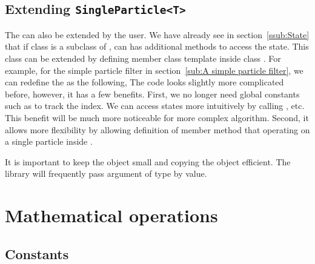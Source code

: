 \documentclass[11pt,bib,mint,hyper,altcolor]{marticle}
\def\spt{\texttt{SingleParticle<T>}}
\begin{document}
\subsection{Extending \protect\spt}
\label{sub:Extending spt}

The  can also be extended by the user. We have
already see in section~\ref{ssub:State} that if class  is a
subclass of ,  can has
additional methods to access the state. This class can be extended by defining
member class template inside class . For example, for the simple
particle filter in section~\ref{sub:A simple particle filter}, we can redefine
the  as the following,
The code looks slightly more complicated before, however, it has a few
benefits. First, we no longer need global constants such as  to
track the index. We can access states more intuitively by calling
, etc. This benefit will be much more noticeable for more
complex algorithm. Second, it allows more flexibility by allowing definition of
member method that operating on a single particle inside
.

It is important to keep the object small and copying the object efficient. The
library will frequently pass argument of  type by
value.

\section{Mathematical operations}
\label{sec:Mathemtical operations}

\subsection{Constants}
\label{sub:Constants}
\end{document}
